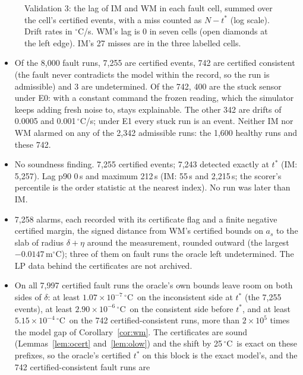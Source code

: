 \documentclass[11pt,a4paper]{article}
\newcommand{\degC}{\ensuremath{{}^\circ}C}
\newcommand{\sci}[2]{\ensuremath{#1\times10^{#2}}}
\newcommand{\tstar}{t^{\ast}}
\begin{document}
\begin{figure}[t]
\centering

\caption{Validation 3: the lag of IM and WM in each fault cell, summed over the cell's certified events, with a miss
counted as $N-\tstar$ (log scale). Drift rates in \degC/s. WM's lag is 0 in seven cells (open diamonds at the left
edge). IM's 27 misses are in the three labelled cells.}
\label{fig:cells}
\end{figure}

\begin{itemize}
\item Of the 8,000 fault runs, 7,255 are certified events, 742 are certified consistent (the fault never contradicts
  the model within the record, so the run is admissible) and 3 are undetermined. Of the 742, 400 are the stuck sensor
  under E0: with a constant command the frozen reading, which the simulator keeps adding fresh noise to, stays
  explainable. The other 342 are drifts of 0.0005 and 0.001\,\degC/s; under E1 every stuck run is an event. Neither IM nor WM alarmed on any of
  the 2,342 admissible runs: the 1,600 healthy runs and these 742.
\item No soundness finding. 7,255 certified events; 7,243 detected exactly at $\tstar$ (IM: 5,257). Lag p90 0\,s and
  maximum 212\,s (IM: 55\,s and 2,215\,s; the scorer's percentile is the order statistic at the nearest index). No run
  was later than IM.
\item 7,258 alarms, each recorded with its certificate flag and a finite negative certified margin, the signed
  distance from WM's certified bounds on $a_s$ to the slab of radius $\delta+\eta$ around the measurement, rounded
  outward (the largest $-0.0147$\,m\degC); three of them on fault runs the oracle left undetermined. The LP data
  behind the certificates are not archived.
\item On all 7,997 certified fault runs the oracle's own bounds leave room on both sides of $\delta$: at least
  \sci{1.07}{-7}\,\degC\ on the inconsistent side at $\tstar$ (the 7,255 events), at least \sci{2.90}{-6}\,\degC\ on
  the consistent side before $\tstar$, and at least \sci{5.15}{-4}\,\degC\ on the 742 certified-consistent runs, more
  than $2\times10^5$ times the model gap of Corollary~\ref{cor:wm}. The certificates are sound
  (Lemmas~\ref{lem:ocert} and~\ref{lem:olow}) and the shift by 25\,\degC\ is exact on these prefixes, so the
  oracle's certified $\tstar$ on this block is the exact model's, and the 742 certified-consistent fault runs are

\end{itemize}
\end{document}
